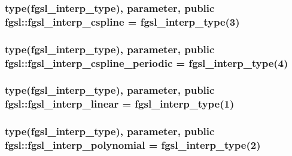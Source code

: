 \hypertarget{classfgsl_aa03de96a2a37daa1c2e464b98e198eb3}{
\subsubsection[{fgsl\-\_\-interp\-\_\-cspline}]{\setlength{\rightskip}{0pt plus 5cm}type({\bf fgsl\-\_\-interp\-\_\-type}), parameter, public fgsl\-::fgsl\-\_\-interp\-\_\-cspline = {\bf fgsl\-\_\-interp\-\_\-type}(3)}}\label{classfgsl_aa03de96a2a37daa1c2e464b98e198eb3}
\hypertarget{classfgsl_a383cf4d39acd2faf1d29a204d9349043}{
\subsubsection[{fgsl\-\_\-interp\-\_\-cspline\-\_\-periodic}]{\setlength{\rightskip}{0pt plus 5cm}type({\bf fgsl\-\_\-interp\-\_\-type}), parameter, public fgsl\-::fgsl\-\_\-interp\-\_\-cspline\-\_\-periodic = {\bf fgsl\-\_\-interp\-\_\-type}(4)}}\label{classfgsl_a383cf4d39acd2faf1d29a204d9349043}
\hypertarget{classfgsl_a56a303cdb0b7046c3d8bfd1ebbf77bbc}{
\subsubsection[{fgsl\-\_\-interp\-\_\-linear}]{\setlength{\rightskip}{0pt plus 5cm}type({\bf fgsl\-\_\-interp\-\_\-type}), parameter, public fgsl\-::fgsl\-\_\-interp\-\_\-linear = {\bf fgsl\-\_\-interp\-\_\-type}(1)}}\label{classfgsl_a56a303cdb0b7046c3d8bfd1ebbf77bbc}
\hypertarget{classfgsl_aedbdc4347cb86cafe5bd0a2da8e38648}{
\subsubsection[{fgsl\-\_\-interp\-\_\-polynomial}]{\setlength{\rightskip}{0pt plus 5cm}type({\bf fgsl\-\_\-interp\-\_\-type}), parameter, public fgsl\-::fgsl\-\_\-interp\-\_\-polynomial = {\bf fgsl\-\_\-interp\-\_\-type}(2)}}\label{classfgsl_aedbdc4347cb86cafe5bd0a2da8e38648}

